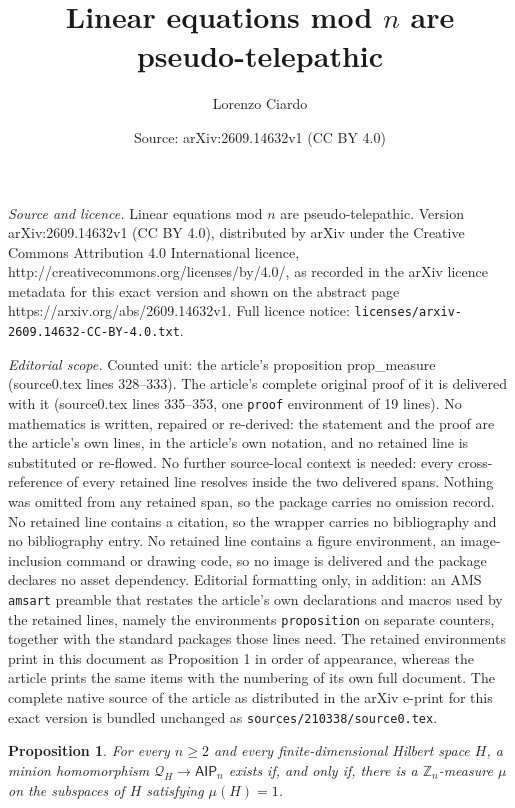 \documentclass[10pt,a4paper]{amsart}
\title{Linear equations mod $n$ are pseudo-telepathic}
\author{Lorenzo Ciardo}
\date{Source: arXiv:2609.14632v1 (CC BY 4.0)}
\newtheorem{proposition}{Proposition}
\newcommand{\AIP}{\mathsf{AIP}}
\newcommand{\Z}{\mathbb Z}
\newcommand{\minion}[1]{{\mathcal #1}}
\begin{document}
\maketitle

\noindent\emph{Source and licence.} Linear equations mod $n$ are pseudo-telepathic. Version arXiv:2609.14632v1 (CC BY 4.0), distributed by arXiv under the Creative Commons Attribution 4.0 International licence, http://creativecommons.org/licenses/by/4.0/, as recorded in the arXiv licence metadata for this exact version and shown on the abstract page https://arxiv.org/abs/2609.14632v1. Full licence notice: \texttt{licenses/arxiv-2609.14632-CC-BY-4.0.txt}.\par\smallskip

\noindent\textit{Editorial scope.} Counted unit: the article's proposition prop\_measure (source0.tex lines 328--333). The article's complete original proof of it is delivered with it (source0.tex lines 335--353, one \texttt{proof} environment of 19 lines). No mathematics is written, repaired or re-derived: the statement and the proof are the article's own lines, in the article's own notation, and no retained line is substituted or re-flowed.  No further source-local context is needed: every cross-reference of every retained line resolves inside the two delivered spans.  Nothing was omitted from any retained span, so the package carries no omission record.  No retained line contains a citation, so the wrapper carries no bibliography and no bibliography entry.  No retained line contains a figure environment, an image-inclusion command or drawing code, so no image is delivered and the package declares no asset dependency.  Editorial formatting only, in addition: an AMS \texttt{amsart} preamble that restates the article's own declarations and macros used by the retained lines, namely the environments \texttt{proposition} on separate counters, together with the standard packages those lines need.  The retained environments print in this document as Proposition 1 in order of appearance, whereas the article prints the same items with the numbering of its own full document.  The complete native source of the article as distributed in the arXiv e-print for this exact version is bundled unchanged as \texttt{sources/210338/source0.tex}.
\begin{proposition}
\label{prop_measure}
For every $n\geq2$ and every finite-dimensional Hilbert space $H$, a minion homomorphism $\minion Q_H\to\AIP_n$ exists
if, and only if, there is a $\Z_n$-measure $\mu$ on the subspaces of $H$ satisfying
$\mu(H)=1$.
\end{proposition}
\end{document}
